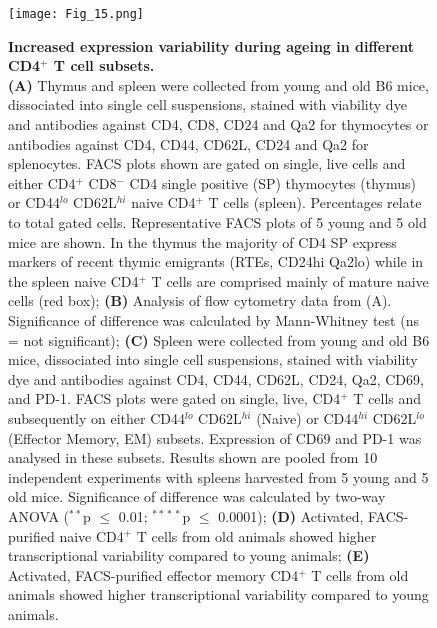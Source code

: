 \begin{figure}[!ht]
\centering
\texttt{[image: Fig\_15.png]}
\caption[Increased expression variability during ageing in different CD4$^+$ T cell subsets]{\textbf{Increased expression variability during ageing in different CD4$^+$ T cell subsets.} \\
\textbf{(A)} Thymus and spleen were collected from young and old B6 mice, dissociated into single cell suspensions, stained with viability dye and antibodies against CD4, CD8, CD24 and Qa2 for thymocytes or antibodies against CD4, CD44, CD62L, CD24 and Qa2 for splenocytes. FACS plots shown are gated on single, live cells and either CD4$^+$ CD8$^-$ CD4 single positive (SP) thymocytes (thymus) or CD44$^{lo}$ CD62L$^{hi}$ naive CD4$^+$ T cells (spleen). Percentages relate to total gated cells. Representative FACS plots of 5 young and 5 old mice are shown. In the thymus the majority of CD4 SP express markers of recent thymic emigrants (RTEs, CD24hi Qa2lo) while in the spleen naive CD4$^+$ T cells are comprised mainly of mature naive cells (red box); \textbf{(B)} Analysis of flow cytometry data from (A). Significance of difference was calculated by Mann-Whitney test (ns = not significant); \textbf{(C)} Spleen were collected from young and old B6 mice, dissociated into single cell suspensions, stained with viability dye and antibodies against CD4, CD44, CD62L, CD24, Qa2, CD69, and PD-1. FACS plots were gated on single, live, CD4$^+$ T cells and subsequently on either CD44$^{lo}$ CD62L$^{hi}$ (Naive) or CD44$^{hi}$ CD62L$^{lo}$ (Effector Memory, EM) subsets. Expression of CD69 and PD-1 was analysed in these subsets. Results shown are pooled from 10 independent experiments with spleens harvested from 5 young and 5 old mice. Significance of difference was calculated by two-way ANOVA ($^{\ast{}\ast}$p $\leq$ 0.01; $^{\ast{}\ast{}\ast{}\ast}$p $\leq$ 0.0001); \textbf{(D)} Activated, FACS-purified naive CD4$^+$ T cells from old animals showed higher transcriptional variability compared to young animals; \textbf{(E)} Activated, FACS-purified effector memory CD4$^+$ T cells from old animals showed higher transcriptional variability compared to young animals.}
\label{fig1:EM_Naive_CD4}
\end{figure}


